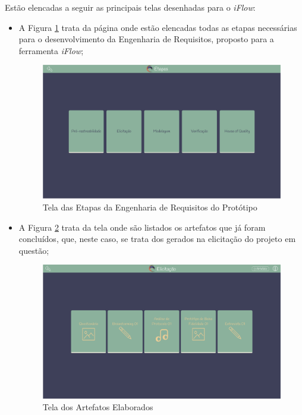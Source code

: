 Estão elencadas a seguir as principais telas desenhadas para o \textit{iFlow}:

\begin{itemize}
    \item A Figura \ref{fig:cards_etapas_prototipo} trata da página onde estão elencadas todas as etapas necessárias para o desenvolvimento da Engenharia de Requisitos, proposto para a ferramenta \textit{iFlow};
    \begin{figure}[]
      \begin{center}
          \caption{{Tela das Etapas da Engenharia de Requisitos do Protótipo}}
          \label{fig:cards_etapas_prototipo}
          \includegraphics[scale=0.36]{figuras/Prototipo/etapas.png}
    \end{center}
    \end{figure}
    \item A Figura \ref{fig:completed_artifacts} trata da tela onde são listados os artefatos que já foram concluídos, que, neste caso, se trata dos gerados na elicitação do projeto em questão;
    \begin{figure}[]
      \begin{center}
          \caption{{Tela dos Artefatos Elaborados}}
          \label{fig:completed_artifacts}
          \includegraphics[scale=0.36]{figuras/Prototipo/completed-artifacts.png}

\end{center}
\end{figure}
\end{itemize}

